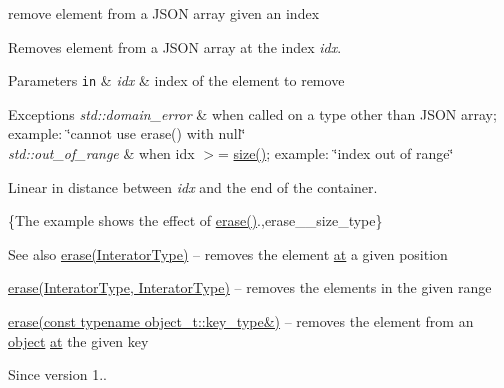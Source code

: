 remove element from a J\+S\+ON array given an index 

Removes element from a J\+S\+ON array at the index {\itshape idx}.


\begin{DoxyParams}[1]{Parameters}
\mbox{\tt in}  & {\em idx} & index of the element to remove\\
\hline
\end{DoxyParams}

\begin{DoxyExceptions}{Exceptions}
{\em std\+::domain\+\_\+error} & when called on a type other than J\+S\+ON array; example\+: {\ttfamily \char`\"{}cannot use erase() with null\char`\"{}} \\
\hline
{\em std\+::out\+\_\+of\+\_\+range} & when {\ttfamily idx $>$= \hyperlink{a00025_a01833b332b68d9af1f7cd7a816c39e49}{size()}}; example\+: {\ttfamily \char`\"{}index out of
range\char`\"{}}\\
\hline
\end{DoxyExceptions}
Linear in distance between {\itshape idx} and the end of the container.

\{The example shows the effect of {\ttfamily \hyperlink{a00025_a45e789042a23138eba2b69f34df9fc45}{erase()}}.,erase\+\_\+\+\_\+size\+\_\+type\}

\begin{DoxySeeAlso}{See also}
\hyperlink{a00025_a45e789042a23138eba2b69f34df9fc45}{erase(\+Interator\+Type)} -- removes the element \hyperlink{a00025_a214a8c22d616fd3567b88932c07436c9}{at} a given position 

\hyperlink{a00025_a263a9ecde33a1f2ff63dcd15d5e42cb7}{erase(\+Interator\+Type, Interator\+Type)} -- removes the elements in the given range 

\hyperlink{a00025_aa36e72ffc3241b960fe9186d19e03bc3}{erase(const typename object\+\_\+t\+::key\+\_\+type\&)} -- removes the element from an \hyperlink{a00025_ad25b2f8c21e241e2d63455537a9294ff}{object} \hyperlink{a00025_a214a8c22d616fd3567b88932c07436c9}{at} the given key
\end{DoxySeeAlso}
\begin{DoxySince}{Since}
version 1.. 
\end{DoxySince}
